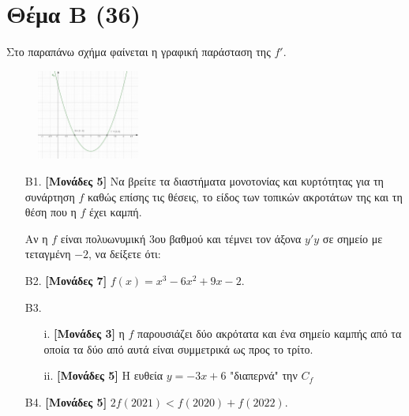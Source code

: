 \documentclass[14pt]{extarticle}
\begin{document}
\section*{Θέμα Β (36)}
Στο παραπάνω σχήμα φαίνεται η γραφική παράσταση της $f'$.
\begin{figure}[h!]
 \includegraphics[width=0.3\textwidth]{2021Prosomeivsi2.png}
 \centering
\end{figure}
\begin{enumerate}
 \item[Β1.] \textbf{[Μονάδες 5]} Να βρείτε τα διαστήματα μονοτονίας και κυρτότητας για τη συνάρτηση $f$ καθώς επίσης τις θέσεις, το είδος των τοπικών ακροτάτων της και τη θέση που η $f$ έχει καμπή.
       
       Αν η $f$ είναι πολυωνυμική 3ου βαθμού και τέμνει τον άξονα $y'y$ σε σημείο με τεταγμένη $-2$, να δείξετε ότι:
       
 \item[Β2.] \textbf{[Μονάδες 7]} $f(x)=x^3-6x^2+9x-2$.
 \item[Β3.]
       \begin{enumerate}
        \item[i.] \textbf{[Μονάδες 3]} η $f$ παρουσιάζει δύο ακρότατα και ένα σημείο καμπής από τα οποία τα δύο από αυτά είναι συμμετρικά ως προς το τρίτο.
        \item[ii.] \textbf{[Μονάδες 5]} Η ευθεία $y=-3x+6$ "διαπερνά" την $C_f$
       \end{enumerate}
 \item[Β4.] \textbf{[Μονάδες 5]} $2f(2021)<f(2020)+f(2022)$.
\end{enumerate}
\end{document}
